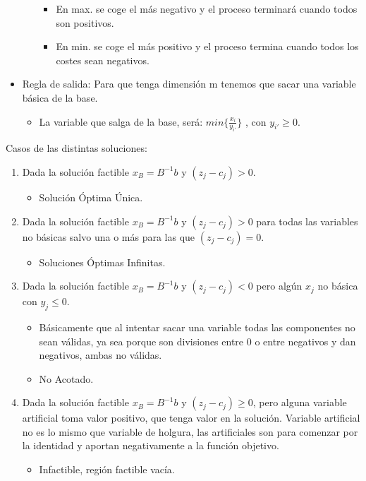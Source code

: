 \documentclass[12pt, twoside, openright]{report} %
\begin{document}
\begin{itemize}
\begin{enumerate}
		            \begin{itemize}
			            \item En max. se coge el más negativo y el proceso terminará cuando
			                  todos son positivos.
			            \item En min. se coge el más positivo y el proceso termina cuando
			                  todos los costes sean negativos.
		            \end{itemize}
	      \end{enumerate}
	\item Regla de salida: Para que tenga dimensión m tenemos que sacar una
	      variable básica de la base.

	      \begin{itemize}
		      \item La variable que salga de la base, será:
		            \(min\{ \frac {x_i} {y_{i'}} \}\) , con \(y_{i'} \geq 0\).
	      \end{itemize}
\end{itemize}
\pagebreak

Casos de las distintas soluciones:
\begin{enumerate}
	\item Dada la solución factible
	      \(x_B=B^{-1}b\) y \((z_j-c_j) > 0\).
	      \begin{itemize}
		      \item Solución Óptima Única.
	      \end{itemize}
	\item Dada la solución factible \(x_B=B^{-1}b\) y \((z_j-c_j) > 0\) para todas
	      las variables no básicas salvo una o más para las que
	      \((z_j-c_j) = 0\).
	      \begin{itemize}
		      \item Soluciones Óptimas Infinitas.
	      \end{itemize}
	\item Dada la solución factible \(x_B=B^{-1}b\) y \((z_j-c_j) < 0\) pero algún \(x_j\) no
	      básica con \(y_j \leq 0\).
	      \begin{itemize}
		      \item Básicamente que al intentar sacar una
		            variable todas las componentes no sean válidas, ya sea porque son
		            divisiones entre 0 o entre negativos y dan negativos, ambas no
		            válidas.
		      \item No Acotado.
	      \end{itemize}
	\item Dada la solución factible \(x_B=B^{-1}b\) y
	      \((z_j-c_j) \geq 0\), pero alguna variable artificial toma valor
	      positivo, que tenga valor en la solución. Variable artificial no es
	      lo mismo que variable de holgura, las artificiales son para comenzar
	      por la identidad y aportan negativamente a la función objetivo.
	      \begin{itemize}
		      \item Infactible, región factible vacía.
	      \end{itemize}
\end{enumerate}
\end{document}
